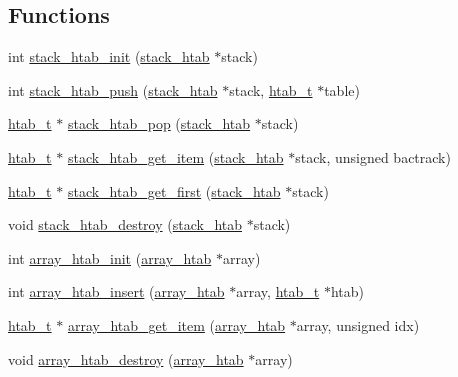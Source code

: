 \subsection*{Functions}
\begin{DoxyCompactItemize}
\item 
int \hyperlink{group__structures_gade1063ec3225ad67340e2e8478e09020}{stack\+\_\+htab\+\_\+init} (\hyperlink{structstack__htab}{stack\+\_\+htab} $\ast$stack)
\item 
int \hyperlink{group__structures_gac3515ca766541c1c138b16b9bde589af}{stack\+\_\+htab\+\_\+push} (\hyperlink{structstack__htab}{stack\+\_\+htab} $\ast$stack, \hyperlink{structhtab__t}{htab\+\_\+t} $\ast$table)
\item 
\hyperlink{structhtab__t}{htab\+\_\+t} $\ast$ \hyperlink{group__structures_ga2153cd165d28f12214e1661ffa42f0a5}{stack\+\_\+htab\+\_\+pop} (\hyperlink{structstack__htab}{stack\+\_\+htab} $\ast$stack)
\item 
\hyperlink{structhtab__t}{htab\+\_\+t} $\ast$ \hyperlink{group__structures_gaf791ea14a19e536affdb313d0181c465}{stack\+\_\+htab\+\_\+get\+\_\+item} (\hyperlink{structstack__htab}{stack\+\_\+htab} $\ast$stack, unsigned bactrack)
\item 
\hyperlink{structhtab__t}{htab\+\_\+t} $\ast$ \hyperlink{group__structures_gac4f958bd4a853211be38f7cbab86247e}{stack\+\_\+htab\+\_\+get\+\_\+first} (\hyperlink{structstack__htab}{stack\+\_\+htab} $\ast$stack)
\item 
void \hyperlink{group__structures_ga4e4c99ae118c48d62f64ab5282a96617}{stack\+\_\+htab\+\_\+destroy} (\hyperlink{structstack__htab}{stack\+\_\+htab} $\ast$stack)
\item 
int \hyperlink{group__structures_ga7b5873a1360a6d32b37093f6f82a6962}{array\+\_\+htab\+\_\+init} (\hyperlink{structarray__htab}{array\+\_\+htab} $\ast$array)
\item 
int \hyperlink{group__structures_ga309020a95495960a1e5d1474ae372146}{array\+\_\+htab\+\_\+insert} (\hyperlink{structarray__htab}{array\+\_\+htab} $\ast$array, \hyperlink{structhtab__t}{htab\+\_\+t} $\ast$htab)
\item 
\hyperlink{structhtab__t}{htab\+\_\+t} $\ast$ \hyperlink{group__structures_ga20e1cf3f284314ec0c9f754e13c88c45}{array\+\_\+htab\+\_\+get\+\_\+item} (\hyperlink{structarray__htab}{array\+\_\+htab} $\ast$array, unsigned idx)
\item 
void \hyperlink{group__structures_ga07bc96c68068ad789ad44a84041dfadf}{array\+\_\+htab\+\_\+destroy} (\hyperlink{structarray__htab}{array\+\_\+htab} $\ast$array)

\end{DoxyCompactItemize}
